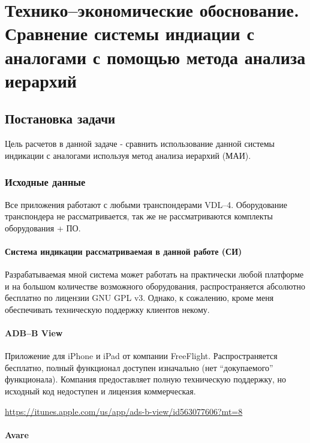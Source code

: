 \documentclass[a4paper,12pt]{report} %
\begin{document}
\chapter{Технико--экономические обоснование. Сравнение системы индиации с
  аналогами с помощью метода анализа иерархий} %

\section{Постановка задачи}

Цель расчетов в данной задаче - сравнить использование данной системы индикации
с аналогами используя метод анализа иерархий (МАИ).

\subsection{Исходные данные}

Все приложения работают с любыми транспондерами VDL--4. Оборудование транспондера
не рассматривается, так же не рассматриваются комплекты оборудования + ПО.

\subsubsection{Система индикации рассматриваемая в данной работе (СИ)}

Разрабатываемая мной система может работать на практически любой платформе и на
большом количестве возможного оборудования, распространяется абсолютно бесплатно
по лицензии GNU GPL v3. Однако, к сожалению, кроме меня обеспечивать техническую
поддержку клиентов некому.

\subsubsection{ADB--B View}

Приложение для iPhone и iPad от компании FreeFlight. Распространяется бесплатно,
полный функционал доступен изначально (нет ``докупаемого'' функционала). Компания предоставляет полную техническую
поддержку, но исходный код недоступен и лицензия коммерческая.

\url{https://itunes.apple.com/us/app/ads-b-view/id563077606?mt=8}

\subsubsection{Avare}
\end{document}
